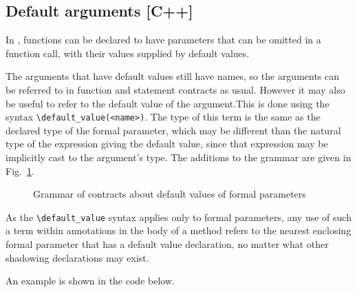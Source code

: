 \subsection{Default arguments [C++]}
\label{sec:defargs}

In \lang, functions can be declared to have parameters that can be omitted in a function call, with their values supplied by default values. 

The arguments that have default values still have names, so the arguments can be referred to in function and statement contracts as usual. However it may also be useful to refer to the default value of the argument.This is done using the syntax \lstinline|\default_value(<name>)|. The type of this term is the same as the declared type of the formal parameter, which may be different than the natural type of the expression giving the default value, since that expression may be implicitly cast to the argument's type. 
The additions to the grammar are given in Fig.~\ref{fig:gram:default-values}.

\begin{figure}[t]
	\begin{cadre}
		
	\end{cadre}
	\caption{Grammar of contracts about default values of formal parameters}
	\label{fig:gram:default-values}
\end{figure}

As the \lstinline|\default_value| syntax applies only to formal parameters, any use of such a term within annotations in the body of a method refers to the nearest enclosing 
formal parameter that has a default value declaration, no
matter what other shadowing declarations may exist.

An example is shown in the code below.

